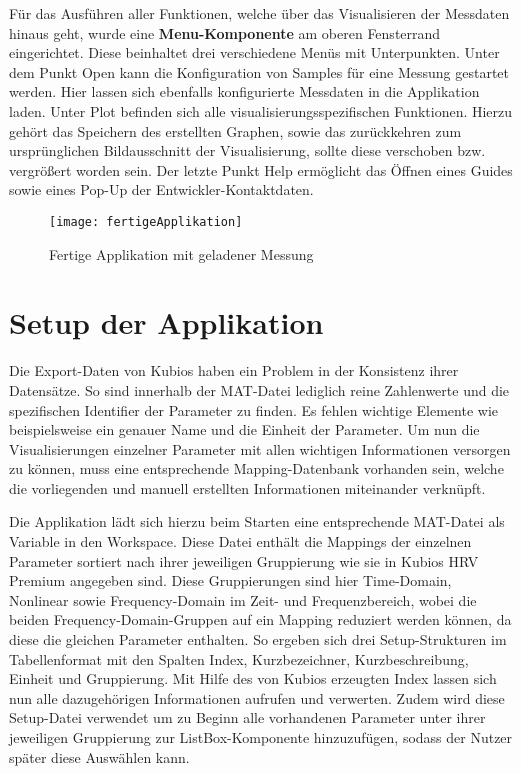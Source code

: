 Für das Ausführen aller Funktionen, welche über das Visualisieren der Messdaten hinaus geht, wurde eine \textbf{Menu-Komponente} am oberen Fensterrand eingerichtet. Diese beinhaltet drei verschiedene Menüs mit Unterpunkten. Unter dem Punkt \glqq Open\grqq{} kann die Konfiguration von Samples für eine Messung gestartet werden. Hier lassen sich ebenfalls konfigurierte Messdaten in die Applikation laden. Unter \glqq Plot\grqq{} befinden sich alle visualisierungsspezifischen Funktionen. Hierzu gehört das Speichern des erstellten Graphen, sowie das zurückkehren zum ursprünglichen Bildausschnitt der Visualisierung, sollte diese verschoben bzw. vergrößert worden sein. Der letzte Punkt \glqq Help\grqq{} ermöglicht das Öffnen eines Guides sowie eines Pop-Up der Entwickler-Kontaktdaten.

\begin{figure}[H]
	\centering
	\texttt{[image: fertigeApplikation]}
	\caption{Fertige Applikation mit geladener Messung}
	\label{fig:fertigeApplikation}
\end{figure}

\section{Setup der Applikation}

Die Export-Daten von Kubios haben ein Problem in der Konsistenz ihrer Datensätze. So sind innerhalb der MAT-Datei lediglich reine Zahlenwerte und die spezifischen Identifier der Parameter zu finden. Es fehlen wichtige Elemente wie beispielsweise ein genauer Name und die Einheit der Parameter. Um nun die Visualisierungen einzelner Parameter mit allen wichtigen Informationen versorgen zu können, muss eine entsprechende Mapping-Datenbank vorhanden sein, welche die vorliegenden und manuell erstellten Informationen miteinander verknüpft.

Die Applikation lädt sich hierzu beim Starten eine entsprechende MAT-Datei als Variable in den Workspace. Diese Datei enthält die Mappings der einzelnen Parameter sortiert nach ihrer jeweiligen Gruppierung wie sie in Kubios HRV Premium angegeben sind. Diese Gruppierungen sind hier Time-Domain, Nonlinear sowie Frequency-Domain im Zeit- und Frequenzbereich, wobei die beiden Frequency-Domain-Gruppen auf ein Mapping reduziert werden können, da diese die gleichen Parameter enthalten. So ergeben sich drei Setup-Strukturen im Tabellenformat mit den Spalten Index, Kurzbezeichner, Kurzbeschreibung, Einheit und Gruppierung. Mit Hilfe des von Kubios erzeugten Index lassen sich nun alle dazugehörigen Informationen aufrufen und verwerten. Zudem wird diese Setup-Datei verwendet um zu Beginn alle vorhandenen Parameter unter ihrer jeweiligen Gruppierung zur ListBox-Komponente hinzuzufügen, sodass der Nutzer später diese Auswählen kann.

